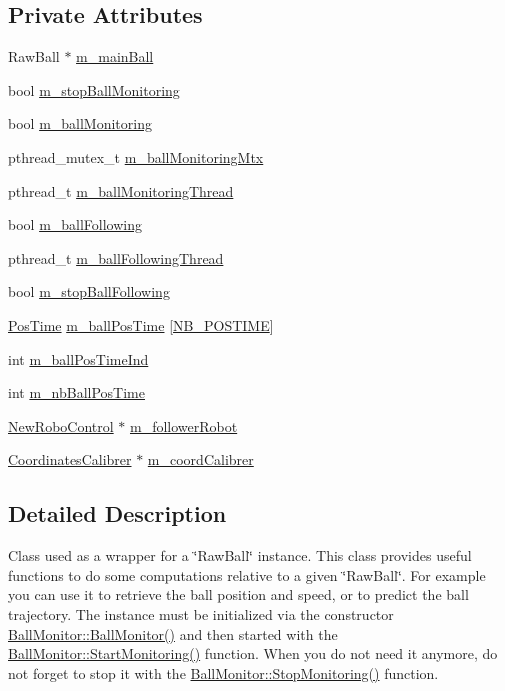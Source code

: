 \subsection*{Private Attributes}
\begin{DoxyCompactItemize}
\item 
RawBall $\ast$ \hyperlink{classBallMonitor_a4bd064999cb8ee1a286c8dd7ac11ce05}{m\_\-mainBall}
\item 
bool \hyperlink{classBallMonitor_a2486fa4296de6308930dc3864e05b61a}{m\_\-stopBallMonitoring}
\item 
bool \hyperlink{classBallMonitor_ac991e138d7e4ae238d2a68365c1caa68}{m\_\-ballMonitoring}
\item 
pthread\_\-mutex\_\-t \hyperlink{classBallMonitor_a5a9a84961419fefc7131d449bab07b0f}{m\_\-ballMonitoringMtx}
\item 
pthread\_\-t \hyperlink{classBallMonitor_a97247e5882aa1012dca3a84ba1350ffe}{m\_\-ballMonitoringThread}
\item 
bool \hyperlink{classBallMonitor_ada441cfbcbac3335a118348945e8b6c7}{m\_\-ballFollowing}
\item 
pthread\_\-t \hyperlink{classBallMonitor_af2b98e5dca99d4d2efc01330d84400d6}{m\_\-ballFollowingThread}
\item 
bool \hyperlink{classBallMonitor_a306a59cfa638a9e4a4c8b6881b5e7f91}{m\_\-stopBallFollowing}
\item 
\hyperlink{structBallMonitor_1_1PosTime}{PosTime} \hyperlink{classBallMonitor_ad20f7e0f913357a70ad2d5113bb7cb5b}{m\_\-ballPosTime} \mbox{[}\hyperlink{classBallMonitor_a6603291a8d6c6a2de7b378ece54d5e2b}{NB\_\-POSTIME}\mbox{]}
\item 
int \hyperlink{classBallMonitor_a2f93064edafac9ef59555ecc8d860e0f}{m\_\-ballPosTimeInd}
\item 
int \hyperlink{classBallMonitor_a80d4362976840374c4e5c207e6a38c86}{m\_\-nbBallPosTime}
\item 
\hyperlink{classNewRoboControl}{NewRoboControl} $\ast$ \hyperlink{classBallMonitor_a3411a0f9095e0d0e948a48b015ff1598}{m\_\-followerRobot}
\item 
\hyperlink{classCoordinatesCalibrer}{CoordinatesCalibrer} $\ast$ \hyperlink{classBallMonitor_addde606e4f6cd92dc43efd3342ce5f60}{m\_\-coordCalibrer}
\end{DoxyCompactItemize}


\subsection{Detailed Description}
Class used as a wrapper for a \char`\"{}RawBall\char`\"{} instance. This class provides useful functions to do some computations relative to a given \char`\"{}RawBall\char`\"{}. For example you can use it to retrieve the ball position and speed, or to predict the ball trajectory. The instance must be initialized via the constructor \hyperlink{classBallMonitor_a176a257973eefa572b6972aa6b5a605d}{BallMonitor::BallMonitor()} and then started with the \hyperlink{classBallMonitor_a4d2b3aa764f5d4f4d5f58b7530565f90}{BallMonitor::StartMonitoring()} function. When you do not need it anymore, do not forget to stop it with the \hyperlink{classBallMonitor_af71db12abeb1f10f7be58eb7591910a3}{BallMonitor::StopMonitoring()} function. 

